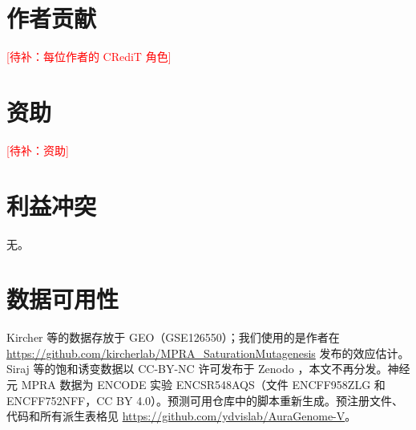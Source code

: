 \documentclass[webpdf,contemporary,large]{oup-authoring-template}
\newcommand{\todo}[1]{\textcolor{red}{[待补：#1]}}
\begin{document}
\section*{作者贡献}
\todo{每位作者的 CRediT 角色}

\section*{资助}
\todo{资助}

\section*{利益冲突}
无。

\section*{数据可用性}
Kircher 等的数据存放于 GEO（GSE126550）\citep{kircher2019saturation}；我们使用的是作者在 \url{https://github.com/kircherlab/MPRA_SaturationMutagenesis} 发布的效应估计。Siraj 等的饱和诱变数据以 CC-BY-NC 许可发布于 Zenodo \citep{siraj2025data}，本文不再分发。神经元 MPRA 数据为 ENCODE 实验 ENCSR548AQS（文件 ENCFF958ZLG 和 ENCFF752NFF，CC BY 4.0）\citep{kosicki2025mpra}。预测可用仓库中的脚本重新生成。预注册文件、代码和所有派生表格见 \url{https://github.com/ydvislab/AuraGenome-V}。



\end{document}
